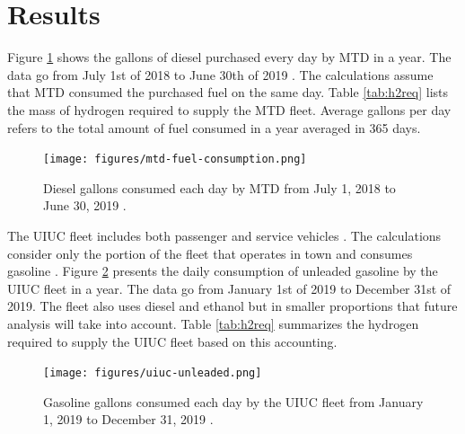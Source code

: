 \documentclass{anstrans}
\begin{document}
\section{Results}

Figure \ref{fig:mtdfuel} shows the gallons of diesel purchased every day by \gls{MTD} in a year. The data go from July 1st of 2018 to June 30th of 2019 \cite{mtd_irecords_2019}. The calculations assume that MTD consumed the purchased fuel on the same day.
Table \ref{tab:h2req} lists the mass of hydrogen required to supply the \gls{MTD} fleet. Average gallons per day refers to the total amount of fuel consumed in a year averaged in 365 days.

\begin{figure}[H]
	\centering
	\texttt{[image: figures/mtd-fuel-consumption.png]}
	\hfill
	\caption{Diesel gallons consumed each day by \gls{MTD} from July 1, 2018 to June 30, 2019 \cite{mtd_irecords_2019}.}
	\label{fig:mtdfuel}
\end{figure}

The \gls{UIUC} fleet includes both passenger and service vehicles \cite{uiuc_institute_for_sustainability_energy_and_environment_increase_2020}. The calculations consider only the portion of the fleet that operates in town and consumes gasoline \cite{uiuc_personnal_communication}. Figure \ref{fig:uiucfuel} presents the daily consumption of unleaded gasoline by the \gls{UIUC} fleet in a year. The data go from January 1st of 2019 to December 31st of 2019. The fleet also uses diesel and ethanol but in smaller proportions that future analysis will take into account.
Table \ref{tab:h2req} summarizes the hydrogen required to supply the \gls{UIUC} fleet based on this accounting.

\begin{figure}[H]
	\centering
	\texttt{[image: figures/uiuc-unleaded.png]}
	\hfill
	\caption{Gasoline gallons consumed each day by the \gls{UIUC} fleet from January 1, 2019 to December 31, 2019 \cite{uiuc_personnal_communication}.}
	\label{fig:uiucfuel}
\end{figure}
\end{document}
